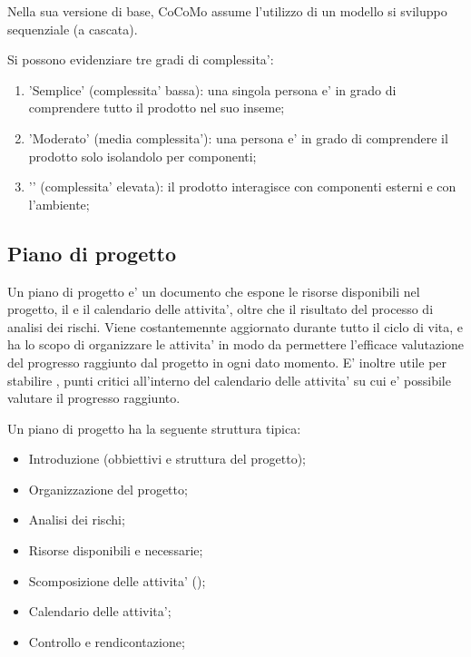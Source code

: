 Nella sua versione di base, CoCoMo assume l'utilizzo di un modello si sviluppo sequenziale (a cascata). 

Si possono evidenziare tre gradi di complessita':
\begin{enumerate}
	\item 'Semplice' (complessita' bassa): una singola persona e' in grado di comprendere tutto il prodotto nel suo inseme;
	\item 'Moderato' (media complessita'): una persona e' in grado di comprendere il prodotto solo isolandolo per componenti;
	\item '' (complessita' elevata): il prodotto interagisce con componenti esterni e con l'ambiente;
\end{enumerate}


\subsection{Piano di progetto}
Un piano di progetto e' un documento che espone le risorse disponibili nel progetto, il  e il calendario delle attivita', oltre che il risultato del processo di analisi dei rischi. Viene costantemennte aggiornato durante tutto il ciclo di vita, e ha lo scopo di organizzare le attivita' in modo da permettere l'efficace valutazione del progresso raggiunto dal progetto in ogni dato momento. E' inoltre utile per stabilire , punti critici all'interno del calendario delle attivita' su cui e' possibile valutare il progresso raggiunto.

Un piano di progetto ha la seguente struttura tipica:
\begin{itemize}
	\item Introduzione (obbiettivi e struttura del progetto);
	\item Organizzazione del progetto;
	\item Analisi dei rischi;
	\item Risorse disponibili e necessarie;
	\item Scomposizione delle attivita' ();
	\item Calendario delle attivita';
	\item Controllo e rendicontazione;
\end{itemize}
